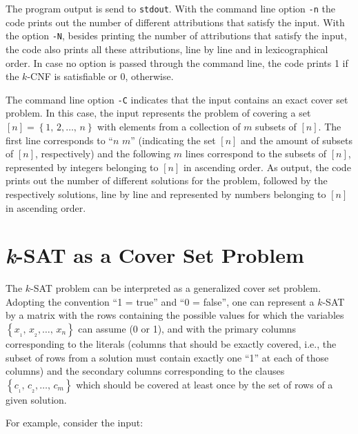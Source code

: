 \documentclass[12pt]{article}
\begin{document}
The program output is send to \texttt{stdout}.
With the command line option \texttt{-n} the code prints out the number of different attributions that satisfy the input.
With the option \texttt{-N}, besides printing the number of attributions that satisfy the input, the code also prints all these attributions, line by line and in lexicographical order.
In case no option is passed through the command line, the code prints 1 if the $k$-CNF is satisfiable or 0, otherwise.

The command line option \texttt{-C} indicates that the input contains an exact cover set problem.
In this case, the input represents the problem of covering a set $[n] = \left\{ 1 , \, 2 , \dots , \, n \right\}$ with elements from a collection of $m$ subsets of $[n]$.
The first line corresponds to ``$n$ $m$'' (indicating the set $[n]$ and the amount of subsets of $[n]$, respectively) and the following $m$ lines correspond to the subsets of $[n]$, represented by integers belonging to $[n]$ in ascending order.
As output, the code prints out the number of different solutions for the problem, followed by the respectively solutions, line by line and represented by numbers belonging to $[n]$ in ascending order.



\section{\emph{k}-SAT as a Cover Set Problem}
\label{sec:ksatcover}

The $k$-SAT problem can be interpreted as a generalized cover set problem.
Adopting the convention ``1 = true'' and ``0 = false'', one can represent a $k$-SAT by a matrix with the rows containing the possible values for which the variables $\left\{ x_{_1} , \, x_{_2} , \dots , \, x_n \right\}$ can assume (0 or 1), and with the primary columns corresponding to the literals (columns that should be exactly covered, i.e., the subset of rows from a solution must contain exactly one ``1'' at each of those columns) and the secondary columns corresponding to the clauses $\left\{ c_{_1} , \, c_{_2} , \dots , \, c_m \right\}$ which should be covered at least once by the set of rows of a given solution.

For example, consider the input:
\end{document}
